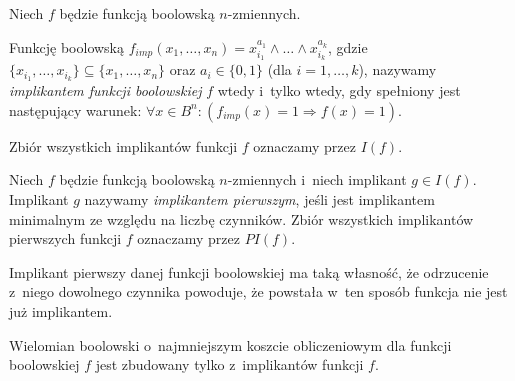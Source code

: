\documentclass[a4paper,11pt,twoside]{article}
\theoremstyle{definition}
\begin{document}
Niech $f$ będzie funkcją boolowską $n$-zmiennych.

Funkcję boolowską $f_{imp}(x_1,\dots,x_n) = x_{i_1}^{a_1} \wedge \dots \wedge x_{i_k}^{a_k}$, gdzie $\{x_{i_1},\dots,x_{i_k}\} \subseteq \{x_{1},\dots,x_{n}\}$ oraz $a_i \in \{0,1\}$ (dla $i=1,\dots,k$), nazywamy {\em implikantem funkcji boolowskiej} $f$ wtedy i~tylko wtedy, gdy spełniony jest następujący warunek: $\forall x \in B^n \colon (f_{imp}(x) = 1 \Rightarrow f(x) = 1)$.

Zbiór wszystkich implikantów funkcji $f$ oznaczamy przez $I(f)$.

Niech $f$ będzie funkcją boolowską $n$-zmiennych i~niech implikant $g \in I(f)$.  Implikant $g$ nazywamy {\em implikantem pierwszym}, jeśli jest implikantem minimalnym ze względu na liczbę czynników. Zbiór wszystkich implikantów pierwszych funkcji $f$ oznaczamy przez $\mathit{PI}(f)$.

Implikant pierwszy danej funkcji boolowskiej ma taką własność, że odrzucenie z~niego dowolnego czynnika powoduje, że powstała w~ten sposób funkcja nie jest już implikantem.

Wielomian boolowski o~najmniejszym koszcie obliczeniowym dla funkcji boolowskiej $f$ jest zbudowany tylko z~implikantów funkcji $f$.
\end{document}
